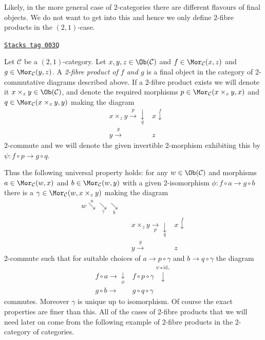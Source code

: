 Likely, in the more general case of $2$-categories there are different
flavours of final objects. We do not want to get into this and hence
we only define $2$-fibre products in the $(2, 1)$-case.

\begin{definition}
\label{categories-definition-2-fibre-products}
\href{https://stacks.math.columbia.edu/tag/003Q}{\texttt{Stacks tag 003Q}}

Let $\mathcal{C}$ be a $(2, 1)$-category.
Let $x, y, z\in \Ob(\mathcal{C})$ and
$f\in \Mor_\mathcal{C}(x, z)$
and $g\in \Mor_{\mathcal C}(y, z)$. A
{\it 2-fibre product of $f$ and $g$} is
a final object in the category of 2-commutative diagrams
described above. If a 2-fibre product exists we
will denote it $x \times_z y\in \Ob(\mathcal{C})$, and denote the
required morphisms $p\in \Mor_{\mathcal C}(x \times_z y, x)$ and
$q\in \Mor_{\mathcal C}(x \times_z y, y)$ making the diagram
$$
\begin{array}{ccc} & x \times_z y \overset{p}{\longrightarrow}\underset{q}{\downarrow} & x \overset{f}{\downarrow} \\  & y \overset{g}{\longrightarrow} & z\end{array}
$$
2-commute and we will denote the given invertible
2-morphism exhibiting this by $\psi : f \circ p \to g \circ q$.
\end{definition}

Thus the following universal property holds: for any
$w\in \Ob(\mathcal{C})$ and morphisms
$a \in \Mor_{\mathcal C}(w, x)$ and
$b \in \Mor_\mathcal{C}(w, y)$ with a given 2-isomorphism
$\phi : f \circ a \to g\circ b$
there is a $\gamma \in \Mor_{\mathcal C}(w, x \times_z y)$
making the diagram
$$
\begin{array}{cccc}w\overset{a}{\searrow}\underset{\gamma}{\searrow}\underset{b}{\searrow} &  &  &  \\  &  & x \times_z y \underset{p}{\longrightarrow}\underset{q}{\downarrow} & x \overset{f}{\downarrow} \\  &  & y \overset{g}{\longrightarrow} & z\end{array}
$$
2-commute such that for suitable choices of
$a \to p \circ \gamma$ and $b \to q \circ \gamma$
the diagram
$$
\begin{array}{cc}f \circ a \longrightarrow\underset{\phi}{\downarrow} & f \circ p \circ \gamma
\overset{\psi \star \text{id}_\gamma}{\downarrow} \\ g\circ b
\longrightarrow & g \circ q \circ \gamma\end{array}
$$
commutes. Moreover $\gamma$ is unique up to isomorphism.
Of course the exact properties are finer than this. All of the
cases of 2-fibre products that we will need later on come from the following
example of 2-fibre products in the 2-category of categories.

